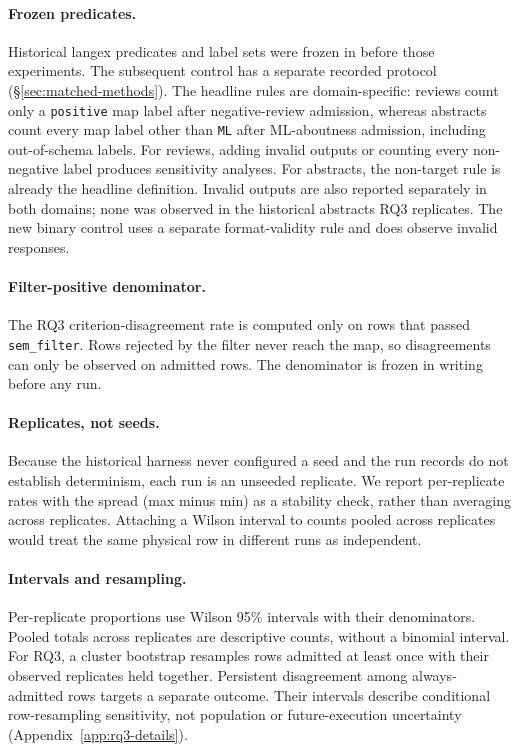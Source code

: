 \documentclass[11pt]{article}
\begin{document}
\paragraph{Frozen predicates.}
Historical langex predicates and label sets were frozen in
 before those experiments. The subsequent
control has a separate recorded protocol (\S\ref{sec:matched-methods}).
The headline rules are domain-specific: reviews count only a
\texttt{positive} map label after negative-review admission, whereas
abstracts count every map label other than \texttt{ML} after ML-aboutness
admission, including out-of-schema labels. For reviews, adding invalid
outputs or counting every non-negative label produces sensitivity analyses.
For abstracts, the non-target rule is already the headline definition.
Invalid outputs are also reported separately in both domains; none was
observed in the historical abstracts RQ3 replicates. The new binary control
uses a separate format-validity rule and does observe invalid responses.

\paragraph{Filter-positive denominator.}
The RQ3 criterion-disagreement rate is computed only on rows that passed
\texttt{sem\_filter}.
Rows rejected by the filter never reach the map, so disagreements can
only be observed on admitted rows.
The denominator is frozen in writing before any run.

\paragraph{Replicates, not seeds.}
Because the historical harness never configured a seed and the run records do not
establish determinism, each run is an unseeded replicate.
We report per-replicate rates with the spread (max minus min) as a
stability check, rather than averaging across replicates.
Attaching a Wilson interval to counts pooled across replicates would treat
the same physical row in different runs as independent.

\paragraph{Intervals and resampling.}
Per-replicate proportions use Wilson 95\% intervals with their denominators.
Pooled totals across replicates are descriptive counts, without a binomial
interval. For RQ3, a cluster bootstrap resamples rows admitted at least once
with their observed replicates held together. Persistent disagreement among
always-admitted rows targets a separate outcome. Their intervals describe
conditional row-resampling sensitivity, not population or future-execution
uncertainty (Appendix~\ref{app:rq3-details}).
\end{document}
